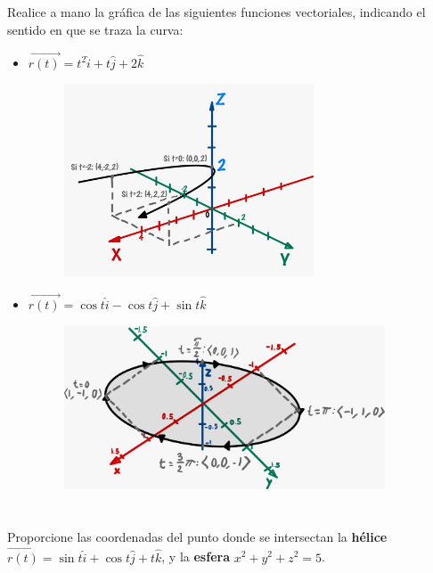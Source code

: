 \documentclass[12pt]{article}
\begin{document}
\section{}
Realice a mano la gráfica de las siguientes funciones vectoriales, indicando el sentido en que se traza la curva:
\begin{itemize}[format=\textbf]

\item $\vec{r(t)} = t^2\hat{i}+t\hat{j}+2\hat{k}$
  \begin{figure}[H]
    \centering
    \includegraphics[width=0.7\textwidth]{./img/t2_ej3_1.jpeg}
  \end{figure}

\item $\vec{r(t)} = \cos{t}\hat{i}-\cos{t}\hat{j}+\sin{t}\hat{k}$
  \begin{figure}[H]
    \centering
    \includegraphics[width=0.9\textwidth]{./img/t2_ej3_2.jpeg}
  \end{figure}

\end{itemize}

\section{}
Proporcione las coordenadas del punto donde se intersectan la \textbf{hélice} $\vec{r(t)}=\sin{t}\hat{i}+\cos{t}\hat{j}+t\hat{k}$, y la \textbf{esfera} $x^2+y^2+z^2=5$.\\
\end{document}
